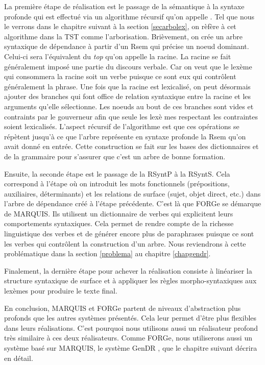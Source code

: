 La première étape de réalisation est le passage de la sémantique à la syntaxe profonde qui est effectué via un algorithme récursif qu'on appelle . Tel que nous le verrons dans le chapitre suivant à la section \ref{secarbolex}, on rèfère à cet algorithme dans la \ac{TST} comme l'arborisation. Brièvement, on crée un arbre syntaxique de dépendance à partir d'un \ac{Rsem} qui précise un noeud dominant. Celui-ci sera l'équivalent du \emph{top} qu'on appelle la racine. La racine se fait généralement imposé une partie du discours verbale. Car on veut que le lexème qui consommera la racine soit un verbe puisque ce sont eux qui contrôlent généralement la phrase. Une fois que la racine est lexicalisé, on peut désormais ajouter des branches qui font office de relation syntaxique entre la racine et les arguments qu'elle sélectionne. Les noeuds au bout de ces branches sont vides et contraints par le gouverneur afin que seule les lexè
mes respectant les contraintes soient lexicalisés. L'aspect récursif de l'algorithme est que ces opérations se répètent jusqu'à ce que l'arbre représente en syntaxe profonde la \ac{Rsem} qu'on avait donné en entrée. Cette construction se fait sur les bases des dictionnaires et de la grammaire pour s'assurer que c'est un arbre de bonne formation.

Ensuite, la seconde étape est le passage de la \ac{RSyntP} à la \ac{RSyntS}. Cela correspond à l'étape où on introduit les mots fonctionnels (prépositions, auxiliaires, déterminants) et les relations de surface (sujet, objet direct, etc.) dans l'arbre de dépendance créé à l'étape précédente. C'est là que FORGe se démarque de MARQUIS. Ils utilisent un dictionnaire de verbes qui explicitent leurs comportements syntaxiques. Cela permet de rendre compte de la richesse linguistique des verbes et de générer encore plus de paraphrases puisque ce sont les verbes qui contrôlent la construction d'un arbre. Nous reviendrons à cette problématique dans la section \ref{problema} au chapitre \ref{chapgendr}.

Finalement, la dernière étape pour achever la réalisation consiste à linéariser la structure syntaxique de surface et à appliquer les règles morpho-syntaxiques aux lexèmes pour produire le texte final.

En conclusion, MARQUIS et FORGe partent de niveaux d'abstraction plus profonds que les autres systèmes présentés. Cela leur permet d'être plus flexibles dans leurs réalisations. C'est pourquoi nous utilisons aussi un réalisateur profond très similaire à ces deux réalisateurs. Comme FORGe, nous utiliserons aussi un système basé sur MARQUIS, le système GenDR \citep{lambrey15,LambreyImplementationcollocationspour2017,lareau18}, que le chapitre suivant décrira en détail.
